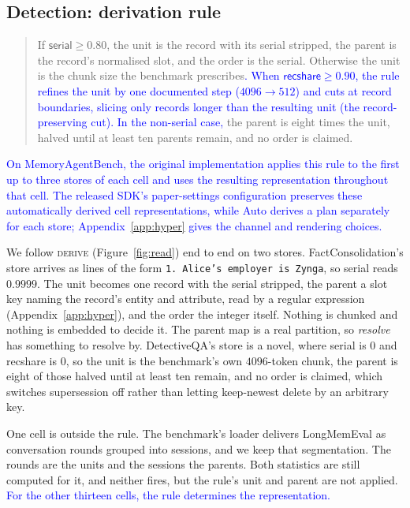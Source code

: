 \documentclass{article}
\newcommand{\nativechange}[1]{\textcolor{blue}{#1}}
\newcommand{\serial}{\textsf{serial}}
\newcommand{\cov}{\textsf{recshare}}
\begin{document}
\subsection{Detection: derivation rule}\label{sec:rule}

\begin{quote}
If $\serial \ge 0.80$, the unit is the record with its serial stripped, the parent is the record's
normalised slot, and the order is the serial. Otherwise the unit is the chunk size the benchmark
prescribes\nativechange{. When $\cov \ge 0.90$, the rule refines the unit by one documented step ($4096\to512$)
and cuts at record boundaries, slicing only records longer than the resulting unit (the record-preserving cut).
In the non-serial case,} the parent is eight times the unit, halved until at least ten parents remain, and
no order is claimed.
\end{quote}

\nativechange{On MemoryAgentBench, the original implementation applies this rule to the first up to three stores of each cell and uses the resulting representation throughout that cell. The released SDK's paper-settings configuration preserves these automatically derived cell representations, while Auto derives a plan separately for each store; Appendix~\ref{app:hyper} gives the channel and rendering choices.}

We follow \textsc{derive} (Figure~\ref{fig:read}) end to end on two stores. FactConsolidation's store arrives as
lines of the form \texttt{1. Alice's employer is Zynga}, so \serial{} reads $0.9999$. The unit becomes one
record with the serial stripped, the parent a slot key naming the record's entity and attribute, read by a
regular expression (Appendix~\ref{app:hyper}), and the order the integer itself. Nothing is chunked and nothing is embedded to decide it. The parent map is a real
partition, so \emph{resolve} has something to resolve by. DetectiveQA's store is a novel, where \serial{}
is $0$ and \cov{} is $0$, so the unit is the benchmark's own $4096$-token chunk, the parent is eight of those
halved until at least ten remain, and no order is claimed, which switches supersession off rather than
letting keep-newest delete by an arbitrary key.

One cell is outside the rule. The benchmark's loader delivers LongMemEval as conversation rounds grouped
into sessions, and we keep that segmentation. The rounds are the units and the sessions the parents. Both
statistics are still computed for it, and neither fires, but the rule's unit and parent are not applied.
\nativechange{For the other thirteen cells, the rule determines the representation.}
\end{document}
